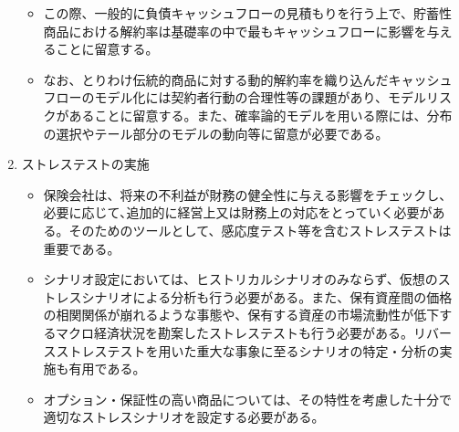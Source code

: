 \documentclass[report,gutter=10mm,fore-edge=10mm,uplatex,dvipdfmx]{jlreq}
\begin{document}
\begin{enumerate}
\begin{itemize}
 \item この際、一般的に負債キャッシュフローの見積もりを行う上で、貯蓄性商品における解約率は基礎率の中で最もキャッシュフローに影響を与えることに留意する。
 \item なお、とりわけ伝統的商品に対する動的解約率を織り込んだキャッシュフローのモデル化には契約者行動の合理性等の課題があり、モデルリスクがあることに留意する。また、確率論的モデルを用いる際には、分布の選択やテール部分のモデルの動向等に留意が必要である。
\end{itemize}
 \item ストレステストの実施
\begin{itemize}
 \item 保険会社は、将来の不利益が財務の健全性に与える影響をチェックし、必要に応じて､追加的に経営上又は財務上の対応をとっていく必要がある。そのためのツールとして、感応度テスト等を含むストレステストは重要である。
 \item シナリオ設定においては、ヒストリカルシナリオのみならず、仮想のストレスシナリオによる分析も行う必要がある。また、保有資産間の価格の相関関係が崩れるような事態や、保有する資産の市場流動性が低下するマクロ経済状況を勘案したストレステストも行う必要がある。リバースストレステストを用いた重大な事象に至るシナリオの特定・分析の実施も有用である。
 \item オプション・保証性の高い商品については、その特性を考慮した十分で適切なストレスシナリオを設定する必要がある。
\end{itemize}
\end{enumerate}

\end{document}
